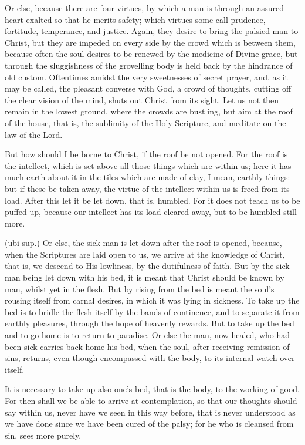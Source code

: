  Or else, because there are four virtues, by which a man is through an assured heart exalted so that he merits safety; which virtues some call prudence, fortitude, temperance, and justice. Again, they desire to bring the palsied man to Christ, but they are impeded on every side by the crowd which is between them, because often the soul desires to be renewed by the medicine of Divine grace, but through the sluggishness of the grovelling body is held back by the hindrance of old custom. Oftentimes amidst the very sweetnesses of secret prayer, and, as it may be called, the pleasant converse with God, a crowd of thoughts, cutting off the clear vision of the mind, shuts out Christ from its sight. Let us not then remain in the lowest ground, where the crowds are bustling, but aim at the roof of the house, that is, the sublimity of the Holy Scripture, and meditate on the law of the Lord.

 But how should I be borne to Christ, if the roof be not opened. For the roof is the intellect, which is set above all those things which are within us; here it has much earth about it in the tiles which are made of clay, I mean, earthly things: but if these be taken away, the virtue of the intellect within us is freed from its load. After this let it be let down, that is, humbled. For it does not teach us to be puffed up, because our intellect has its load cleared away, but to be humbled still more.

 (ubi sup.) Or else, the sick man is let down after the roof is opened, because, when the Scriptures are laid open to us, we arrive at the knowledge of Christ, that is, we descend to His lowliness, by the dutifulness of faith. But by the sick man being let down with his bed, it is meant that Christ should be known by man, whilst yet in the flesh. But by rising from the bed is meant the soul’s rousing itself from carnal desires, in which it was lying in sickness. To take up the bed is to bridle the flesh itself by the bands of continence, and to separate it from earthly pleasures, through the hope of heavenly rewards. But to take up the bed and to go home is to return to paradise. Or else the man, now healed, who had been sick carries back home his bed, when the soul, after receiving remission of sins, returns, even though encompassed with the body, to its internal watch over itself.

 It is necessary to take up also one’s bed, that is the body, to the working of good. For then shall we be able to arrive at contemplation, so that our thoughts should say within us, never have we seen in this way before, that is never understood as we have done since we have been cured of the palsy; for he who is cleansed from sin, sees more purely.

